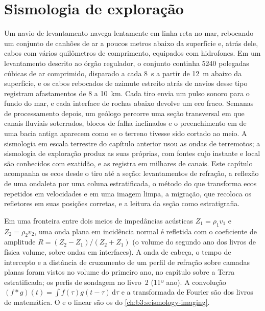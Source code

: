 \chapter{Sismologia de exploração}\label{ch:b3:exploration-seismology}

Um navio de levantamento navega lentamente em linha reta no mar, rebocando um conjunto de
canhões de ar a poucos metros abaixo da superfície e, atrás dele, cabos com vários
quilômetros de comprimento, equipados com hidrofones. Em um levantamento descrito ao
órgão regulador, o conjunto continha \num{5240} polegadas cúbicas de ar comprimido, disparado a cada
\qty{8}{s} a partir de \qty{12}{m} abaixo da superfície, e os cabos rebocados de azimute estreito
atrás de navios desse tipo registram afastamentos de 8 a \qty{10}{km}.
Cada tiro envia um pulso sonoro para o fundo do mar, e cada interface de rochas
abaixo devolve um eco fraco. Semanas de processamento depois, um geólogo percorre
uma seção transversal em que canais fluviais soterrados, blocos de falha inclinados e
o preenchimento em  de uma bacia antiga aparecem como se o terreno tivesse sido cortado ao meio.
A sismologia em escala terrestre do capítulo anterior usou as ondas de
terremotos; a sismologia de exploração produz as suas próprias, com fontes cujo instante e
local são conhecidos com exatidão, e as registra em milhares de canais. Este
capítulo acompanha os ecos desde o tiro até a seção: levantamentos de refração,
a reflexão de uma ondaleta por uma coluna estratificada, o método do 
que transforma ecos repetidos em velocidades e em uma imagem limpa, a migração, que
recoloca os refletores em suas posições corretas, e a leitura da seção como
estratigrafia.

\begin{recall}
Em uma fronteira entre dois meios de impedâncias acústicas $Z_1 = \rho_1v_1$ e
$Z_2 = \rho_2v_2$, uma onda plana em incidência normal é refletida com o
coeficiente de amplitude $R = (Z_2 - Z_1)/(Z_2 + Z_1)$ (o volume do segundo ano dos livros de física
volume, sobre ondas em interfaces). A onda de cabeça, o tempo de intercepto e a
distância de cruzamento de um perfil de refração sobre camadas planas foram vistos no
volume do primeiro ano, no capítulo sobre a Terra estratificada; os perfis de sondagem no livro~2
(11º ano). A convolução $(f*g)(t) = \int f(\tau)g(t - \tau)\,\mathrm d\tau$
e a transformada de Fourier são dos livros de matemática. O  e o
 linear são os do \cref{ch:b3:seismology-imaging}.
\end{recall}

